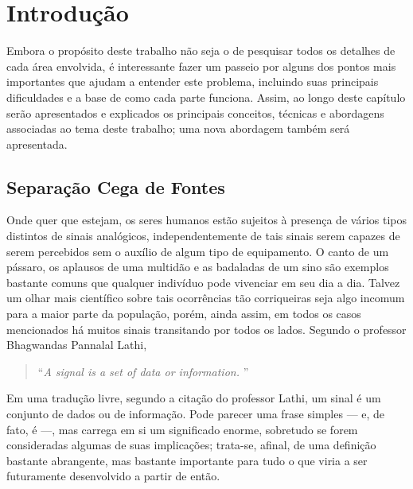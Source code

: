 \chapter{Introdução}
\label{cha:intro}

\setcounter{page}{1}



Embora o propósito deste trabalho não seja o de pesquisar todos os detalhes de cada área envolvida, é interessante fazer um passeio por alguns dos pontos mais importantes que ajudam a entender este problema, incluindo suas principais dificuldades e a base de como cada parte funciona. Assim, ao longo deste capítulo serão apresentados e explicados os principais conceitos, técnicas e abordagens associadas ao tema deste trabalho; uma nova abordagem também será apresentada.




\section{Separação Cega de Fontes}
\label{sec:intro_bss}

Onde quer que estejam, os seres humanos estão sujeitos à presença de vários tipos distintos de sinais analógicos, independentemente de tais sinais serem capazes de serem percebidos sem o auxílio de algum tipo de equipamento. O canto de um pássaro, os aplausos de uma multidão e as badaladas de um sino são exemplos bastante comuns que qualquer indivíduo pode vivenciar em seu dia a dia. Talvez um olhar mais científico sobre tais ocorrências tão corriqueiras seja algo incomum para a maior parte da população, porém, ainda assim, em todos os casos mencionados há muitos sinais transitando por todos os lados. Segundo o professor Bhagwandas Pannalal Lathi,

\begin{formal}
\begin{quote}
\begin{flushright}
    \textcolor{citeblue}{\textquotedblleft \textit{A signal is a set of data or information.} \textquotedblright}\\ \citep{lathi2009linear}
\end{flushright}
\end{quote}
\end{formal}

Em uma tradução livre, segundo a citação do professor Lathi, um sinal é um conjunto de dados ou de informação. Pode parecer uma frase simples --- e, de fato, é ---, mas carrega em si um significado enorme, sobretudo se forem consideradas algumas de suas implicações; trata-se, afinal, de uma definição bastante abrangente, mas bastante importante para tudo o que viria a ser futuramente desenvolvido a partir de então.

